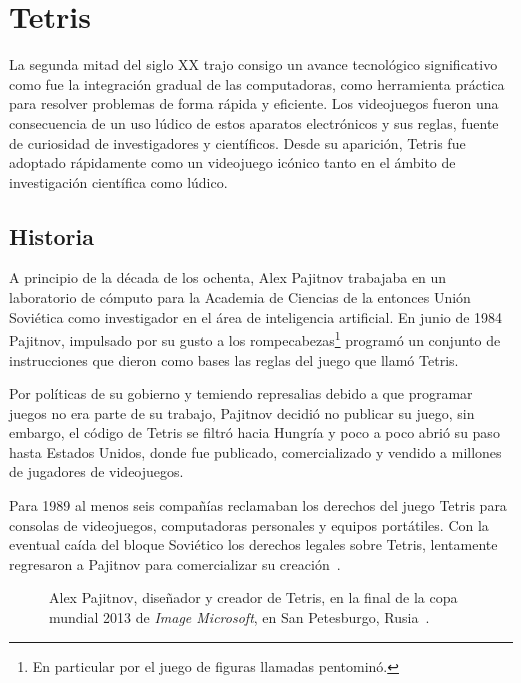 \chapter{Tetris}
\label{chap:cuatro}

La segunda mitad del siglo XX trajo consigo un avance tecnológico 
significativo como fue la integración gradual de las computadoras, como 
herramienta práctica para resolver problemas de forma rápida y eficiente. Los videojuegos 
fueron una consecuencia de un uso lúdico de estos aparatos electrónicos y sus 
reglas, fuente de curiosidad de investigadores y científicos. Desde su aparición, 
Tetris fue adoptado rápidamente como un videojuego icónico tanto en el ámbito de 
investigación científica como lúdico. 

\section{Historia}

A principio de la década de los ochenta, Alex Pajitnov trabajaba en un
laboratorio de cómputo para la Academia de Ciencias de la entonces Unión Soviética
como investigador en el área de inteligencia artificial. En junio de 1984
Pajitnov, impulsado por su gusto a los rompecabezas\footnote{En particular por
  el juego de figuras llamadas pentominó.} programó un conjunto de instrucciones
que dieron como bases las reglas del juego que llamó Tetris.

Por políticas de su gobierno y temiendo represalias debido a que programar
juegos no era parte de su trabajo, Pajitnov decidió no publicar su juego, sin
embargo, el código de Tetris se filtró hacia Hungría y poco a poco
abrió su paso hasta Estados Unidos, donde fue publicado, 
comercializado y vendido a millones de jugadores de videojuegos.

Para 1989 al menos seis compañías reclamaban los derechos del juego Tetris
para consolas de videojuegos, computadoras personales y equipos portátiles.
Con la eventual caída del bloque Soviético los derechos legales sobre Tetris,
lentamente regresaron a Pajitnov para comercializar su creación~\cite{tetris-history}.

\begin{figure}[h]
    \centering
    \setlength{\fboxrule}{1pt}
    \caption{Alex Pajitnov, diseñador y creador de
    Tetris, en la final de la copa mundial 2013 de \textit{Image Microsoft}, en San Petesburgo, Rusia~\cite{WikipediaEN:AlexeyPajitnov}.}
    \label{fig:AlexPajitnov}
\end{figure}

